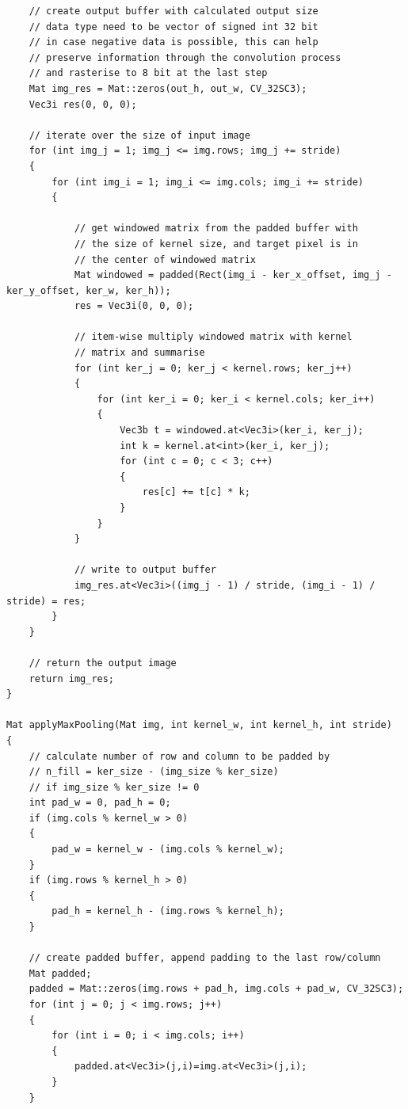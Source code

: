 \documentclass[12pt,a4paper]{report}
\begin{document}
\begin{lstlisting}
    // create output buffer with calculated output size
    // data type need to be vector of signed int 32 bit
    // in case negative data is possible, this can help
    // preserve information through the convolution process
    // and rasterise to 8 bit at the last step
    Mat img_res = Mat::zeros(out_h, out_w, CV_32SC3);
    Vec3i res(0, 0, 0);

    // iterate over the size of input image
    for (int img_j = 1; img_j <= img.rows; img_j += stride)
    {
        for (int img_i = 1; img_i <= img.cols; img_i += stride)
        {

            // get windowed matrix from the padded buffer with 
            // the size of kernel size, and target pixel is in
            // the center of windowed matrix
            Mat windowed = padded(Rect(img_i - ker_x_offset, img_j - ker_y_offset, ker_w, ker_h));
            res = Vec3i(0, 0, 0);

            // item-wise multiply windowed matrix with kernel 
            // matrix and summarise 
            for (int ker_j = 0; ker_j < kernel.rows; ker_j++)
            {
                for (int ker_i = 0; ker_i < kernel.cols; ker_i++)
                {
                    Vec3b t = windowed.at<Vec3i>(ker_i, ker_j);
                    int k = kernel.at<int>(ker_i, ker_j);
                    for (int c = 0; c < 3; c++)
                    {
                        res[c] += t[c] * k;
                    }
                }
            }

            // write to output buffer
            img_res.at<Vec3i>((img_j - 1) / stride, (img_i - 1) / stride) = res;
        }
    }

    // return the output image
    return img_res;
}

Mat applyMaxPooling(Mat img, int kernel_w, int kernel_h, int stride)
{
    // calculate number of row and column to be padded by
    // n_fill = ker_size - (img_size % ker_size)
    // if img_size % ker_size != 0
    int pad_w = 0, pad_h = 0;
    if (img.cols % kernel_w > 0)
    {
        pad_w = kernel_w - (img.cols % kernel_w);
    }
    if (img.rows % kernel_h > 0)
    {
        pad_h = kernel_h - (img.rows % kernel_h);
    }

    // create padded buffer, append padding to the last row/column
    Mat padded;
    padded = Mat::zeros(img.rows + pad_h, img.cols + pad_w, CV_32SC3);
    for (int j = 0; j < img.rows; j++)
    {
        for (int i = 0; i < img.cols; i++)
        {
            padded.at<Vec3i>(j,i)=img.at<Vec3i>(j,i);
        }
    }


\end{lstlisting}
\end{document}
